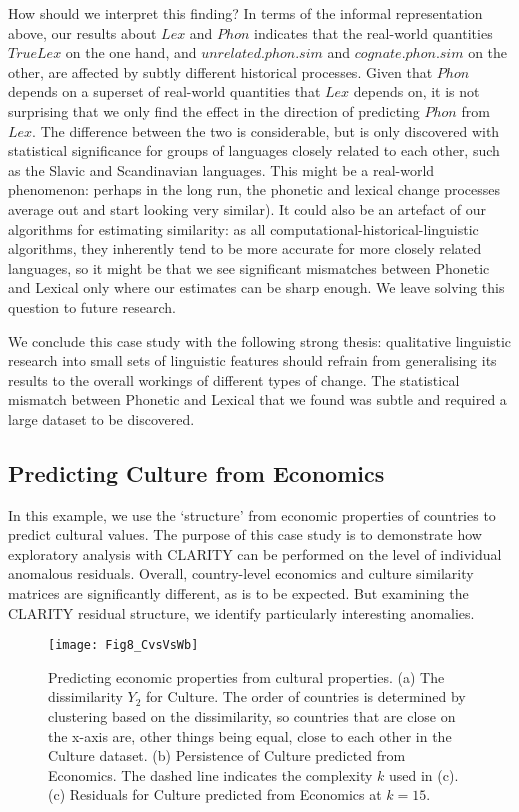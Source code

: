 \documentclass[a4]{article}
\newcommand{\+}[1]{\mathbf{#1}}
\begin{document}
How should we interpret this finding? In terms of the informal representation above, our results about $Lex$ and $Phon$ indicates that the real-world quantities $TrueLex$ on the one hand, and $unrelated.phon.sim$ and $cognate.phon.sim$ on the other, are affected by subtly different historical processes. Given that $Phon$ depends on a superset of real-world quantities that $Lex$ depends on, it is not surprising that we only find the effect in the direction of predicting $Phon$ from $Lex$. The difference between the two is considerable, but is only discovered with statistical significance for groups of languages closely related to each other, such as the Slavic and Scandinavian languages. This might be a real-world phenomenon: perhaps in the long run, the phonetic and lexical change processes average out and start looking very similar). It could also be an artefact of our algorithms for estimating similarity: as all computational-historical-linguistic algorithms, they inherently tend to be more accurate for more closely related languages, so it might be that we  see significant mismatches between Phonetic and Lexical only where our estimates can be sharp enough. We leave solving this question to future research. 

We conclude this case study with the following strong thesis: qualitative linguistic research into small sets of linguistic features should refrain from generalising its results to the overall workings of different types of change. The statistical mismatch between Phonetic and Lexical that we found was subtle and required a large dataset to be discovered. 

\subsection{Predicting Culture from Economics}
\label{sec:culture}

In this example, we use the `structure' from economic properties of countries to predict cultural values. The purpose of this case study is to demonstrate how exploratory analysis with CLARITY can be performed on the level of individual anomalous residuals. 
Overall, country-level economics and culture similarity matrices are significantly different, as is to be expected. But examining the CLARITY residual structure, we identify particularly interesting anomalies. 


\begin{figure}[!htbp]
\begin{center}
 \centerline{\texttt{[image: Fig8\_CvsVsWb]}}
 \caption{Predicting economic properties  from cultural properties. (a)  The dissimilarity $Y_2$ for Culture. The order of countries is determined by clustering based on the dissimilarity, so countries that are close on the x-axis are, other things being equal, close to each other in the Culture dataset. (b)  Persistence of Culture predicted from Economics. The dashed line indicates the complexity $k$ used in (c). (c) Residuals for Culture predicted from Economics at $k=15$.}
\label{fig:culture}
\end{center}
\end{figure}
\end{document}
